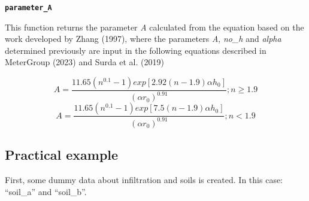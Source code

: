 \documentclass[
]{article}
\begin{document}
\textbf{\texttt{parameter\_A}}

This function returns the parameter \emph{A} calculated from the
equation based on the work developed by Zhang (1997), where the
parameters \emph{A}, \emph{no\_h} and \emph{alpha} determined previously
are input in the following equations described in MeterGroup (2023) and
Surda et al. (2019)

\[A = \frac{11.65(n^{0.1}-1)exp[2.92(n - 1.9)\alpha h_{0}]}{(\alpha r_{0})^{0.91}} ; n\geq 1.9 \]
\[A = \frac{11.65(n^{0.1}-1)exp[7.5(n - 1.9)\alpha h_{0}]}{(\alpha r_{0})^{0.91}} ; n < 1.9 \]

\newpage{}

\hypertarget{practical-example}{%
\subsection{Practical example}\label{practical-example}}

First, some dummy data about infiltration and soils is created. In this
case: ``soil\_a'' and ``soil\_b''.
\end{document}
